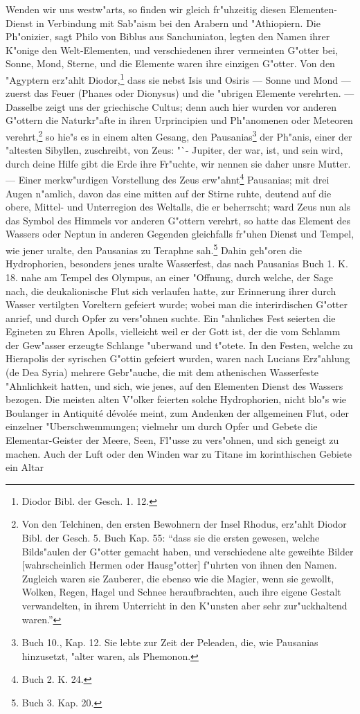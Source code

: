\documentclass[a4paper, 11pt, oneside, polutonikogreek, german]{article}
\begin{document}
Wenden wir uns westw"arts, so finden wir gleich fr"uhzeitig diesen Elementen-Dienst in Verbindung mit Sab"aism bei den Arabern und "Athiopiern. Die Ph"onizier, sagt Philo von Biblus aus Sanchuniaton, legten den Namen ihrer K"onige den Welt-Elementen, und verschiedenen ihrer vermeinten G"otter bei, Sonne, Mond, Sterne, und die Elemente waren ihre einzigen G"otter. Von den "Agyptern erz"ahlt Diodor,\footnote{Diodor Bibl. der Gesch. 1. 12.} dass sie nebst Isis und Osiris --- Sonne und Mond --- zuerst das Feuer (Phanes oder Dionysus) und die "ubrigen Elemente verehrten. --- Dasselbe zeigt uns der griechische Cultus; denn auch hier wurden vor anderen G"ottern die Naturkr"afte in ihren Urprincipien und Ph"anomenen oder Meteoren verehrt,\footnote{Von den Telchinen, den ersten Bewohnern der Insel Rhodus, erz"ahlt Diodor Bibl. der Gesch. 5. Buch Kap. 55: "`dass sie die ersten gewesen, welche Bilds"aulen der G"otter gemacht haben, und verschiedene alte geweihte Bilder [wahrscheinlich Hermen oder Hausg"otter] f"uhrten von ihnen den Namen. Zugleich waren sie Zauberer, die ebenso wie die Magier, wenn sie gewollt, Wolken, Regen, Hagel und Schnee heraufbrachten, auch ihre eigene Gestalt verwandelten, in ihrem Unterricht in den K"unsten aber sehr zur"uckhaltend waren."'} so hie"s es in einem alten Gesang, den Pausanias\footnote{Buch 10., Kap. 12. Sie lebte zur Zeit der Peleaden, die, wie Pausanias hinzusetzt, "alter waren, als Phemonon.} der Ph"anis, einer der "altesten Sibyllen, zuschreibt, von Zeus: "`- Jupiter, der war, ist, und sein wird, durch deine Hilfe gibt die Erde ihre Fr"uchte, wir nennen sie daher unsre Mutter. --- Einer merkw"urdigen Vorstellung des Zeus erw"ahnt\footnote{Buch 2. K. 24.} Pausanias; mit drei Augen n"amlich, davon das eine mitten auf der Stirne ruhte, deutend auf die obere, Mittel- und Unterregion des Weltalls, die er beherrscht; ward Zeus nun als das Symbol des Himmels vor anderen G"ottern verehrt, so hatte das Element des Wassers oder Neptun in anderen Gegenden gleichfalls fr"uhen Dienst und Tempel, wie jener uralte, den Pausanias zu Teraphne sah.\footnote{Buch 3. Kap. 20.} Dahin geh"oren die Hydrophorien, besonders jenes uralte Wasserfest, das nach Pausanias Buch 1. K. 18. nahe am Tempel des Olympus, an einer "Offnung, durch welche, der Sage nach, die deukalionische Flut sich verlaufen hatte, zur Erinnerung ihrer durch Wasser vertilgten Voreltern gefeiert wurde; wobei man die interirdischen G"otter anrief, und durch Opfer zu vers"ohnen suchte. Ein "ahnliches Fest seierten die Egineten zu Ehren Apolls, vielleicht weil er der Gott ist, der die vom Schlamm der Gew"asser erzeugte Schlange "uberwand und t"otete. In den Festen, welche zu Hierapolis der syrischen G"ottin gefeiert wurden, waren nach Lucians Erz"ahlung (de Dea Syria) mehrere Gebr"auche, die mit dem athenischen Wasserfeste "Ahnlichkeit hatten, und sich, wie jenes, auf den Elementen Dienst des Wassers bezogen. Die meisten alten V"olker feierten solche Hydrophorien, nicht blo"s wie Boulanger in Antiquité dévolée meint, zum Andenken der allgemeinen Flut, oder einzelner "Uberschwemmungen; vielmehr um durch Opfer und Gebete die Elementar-Geister der Meere, Seen, Fl"usse zu vers"ohnen, und sich geneigt zu machen. Auch der Luft oder den Winden war zu Titane im korinthischen Gebiete ein Altar 
\end{document}
